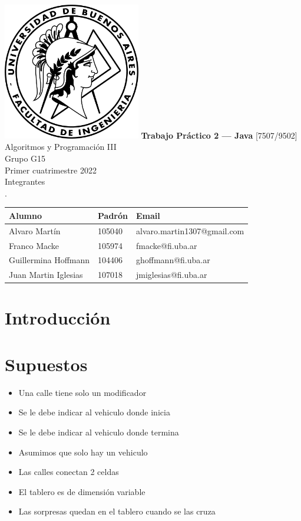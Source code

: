 \documentclass[titlepage,a4paper]{article}
\begin{document}
\begin{titlepage} %
	\hfill\includegraphics[width=6cm]{logofiuba.jpg}
    \centering
    \vfill
    \Huge \textbf{Trabajo Práctico 2 — Java}
    \vskip2cm
    \Large [7507/9502] Algoritmos y Programación III\\
    Grupo G15 \\
    Primer cuatrimestre 2022 \\
    \vfill
    Integrantes \\
    .\\
    \begin{tabular}{ | l | l | l | } %
      \hline
      Alumno & Padrón & Email \\ \hline
      Alvaro Martín & 105040 & alvaro.martin1307@gmail.com \\ \hline
      Franco Macke & 105974 & fmacke@fi.uba.ar \\ \hline
      Guillermina Hoffmann & 104406 & ghoffmann@fi.uba.ar \\ \hline
      Juan Martin Iglesias & 107018 & jmiglesias@fi.uba.ar \\ \hline
  	\end{tabular}
    \vfill
    \vfill
\end{titlepage}

\tableofcontents %
\newpage

\section{Introducción}\label{sec:intro}

\section{Supuestos}\label{sec:supuestos}
  \begin{itemize}
    \item Una calle tiene solo un modificador
    \item Se le debe indicar al vehiculo donde inicia
    \item Se le debe indicar al vehiculo donde termina
    \item Asumimos que solo hay un vehiculo
    \item Las calles conectan 2 celdas
    \item El tablero es de dimensión variable
    \item Las sorpresas quedan en el tablero cuando se las cruza
  \end{itemize}
\end{document}
